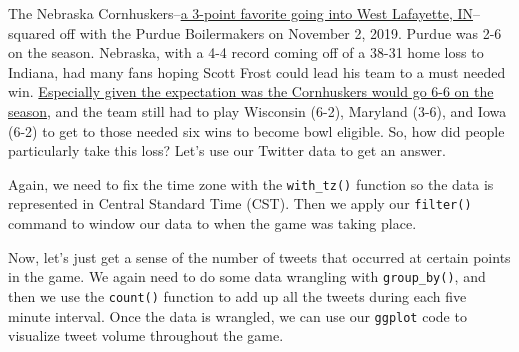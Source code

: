 \documentclass[
]{book}
\newenvironment{Shaded}{\begin{snugshade}}{\end{snugshade}}
\newcommand{\DataTypeTok}[1]{\textcolor[rgb]{0.13,0.29,0.53}{#1}}
\newcommand{\KeywordTok}[1]{\textcolor[rgb]{0.13,0.29,0.53}{\textbf{#1}}}
\newcommand{\NormalTok}[1]{#1}
\newcommand{\OperatorTok}[1]{\textcolor[rgb]{0.81,0.36,0.00}{\textbf{#1}}}
\newcommand{\StringTok}[1]{\textcolor[rgb]{0.31,0.60,0.02}{#1}}
\begin{document}
The Nebraska Cornhuskers--\href{https://nebraska.rivals.com/news/nebraska-at-purdue-keys-to-victory-hol-score-predictions}{a 3-point favorite going into West Lafayette, IN}--squared off with the Purdue Boilermakers on November 2, 2019. Purdue was 2-6 on the season. Nebraska, with a 4-4 record coming off of a 38-31 home loss to Indiana, had many fans hoping Scott Frost could lead his team to a must needed win. \href{https://journalstar.com/sports/huskers/sipple/steven-m-sipple-frost-s-reaction-to-moos-six-win/article_bcebc067-865e-59a7-948d-c99290201294.html}{Especially given the expectation was the Cornhuskers would go 6-6 on the season}, and the team still had to play Wisconsin (6-2), Maryland (3-6), and Iowa (6-2) to get to those needed six wins to become bowl eligible. So, how did people particularly take this loss? Let's use our Twitter data to get an answer.

Again, we need to fix the time zone with the \texttt{with\_tz()} function so the data is represented in Central Standard Time (CST). Then we apply our \texttt{filter()} command to window our data to when the game was taking place.

\begin{Shaded}
\end{Shaded}

Now, let's just get a sense of the number of tweets that occurred at certain points in the game. We again need to do some data wrangling with \texttt{group\_by()}, and then we use the \texttt{count()} function to add up all the tweets during each five minute interval. Once the data is wrangled, we can use our \texttt{ggplot} code to visualize tweet volume throughout the game.
\end{document}
